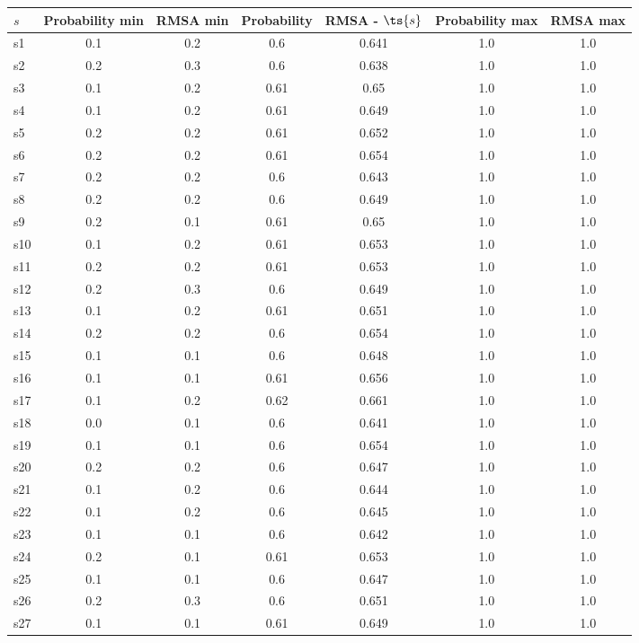 \documentclass{article}
\begin{document}
\noindent\begin{tabular}{|l|c|c|c|c|c|c|}
\hline
$s$& Probability min & RMSA min & Probability & RMSA - $\ts{s}$ & Probability max & RMSA max\\
\hline
s1 &0.1 & 0.2 & 0.6 & 0.641 & 1.0 & 1.0\\
\hline
s2 &0.2 & 0.3 & 0.6 & 0.638 & 1.0 & 1.0\\
\hline
s3 &0.1 & 0.2 & 0.61 & 0.65 & 1.0 & 1.0\\
\hline
s4 &0.1 & 0.2 & 0.61 & 0.649 & 1.0 & 1.0\\
\hline
s5 &0.2 & 0.2 & 0.61 & 0.652 & 1.0 & 1.0\\
\hline
s6 &0.2 & 0.2 & 0.61 & 0.654 & 1.0 & 1.0\\
\hline
s7 &0.2 & 0.2 & 0.6 & 0.643 & 1.0 & 1.0\\
\hline
s8 &0.2 & 0.2 & 0.6 & 0.649 & 1.0 & 1.0\\
\hline
s9 &0.2 & 0.1 & 0.61 & 0.65 & 1.0 & 1.0\\
\hline
s10 &0.1 & 0.2 & 0.61 & 0.653 & 1.0 & 1.0\\
\hline
s11 &0.2 & 0.2 & 0.61 & 0.653 & 1.0 & 1.0\\
\hline
s12 &0.2 & 0.3 & 0.6 & 0.649 & 1.0 & 1.0\\
\hline
s13 &0.1 & 0.2 & 0.61 & 0.651 & 1.0 & 1.0\\
\hline
s14 &0.2 & 0.2 & 0.6 & 0.654 & 1.0 & 1.0\\
\hline
s15 &0.1 & 0.1 & 0.6 & 0.648 & 1.0 & 1.0\\
\hline
s16 &0.1 & 0.1 & 0.61 & 0.656 & 1.0 & 1.0\\
\hline
s17 &0.1 & 0.2 & 0.62 & 0.661 & 1.0 & 1.0\\
\hline
s18 &0.0 & 0.1 & 0.6 & 0.641 & 1.0 & 1.0\\
\hline
s19 &0.1 & 0.1 & 0.6 & 0.654 & 1.0 & 1.0\\
\hline
s20 &0.2 & 0.2 & 0.6 & 0.647 & 1.0 & 1.0\\
\hline
s21 &0.1 & 0.2 & 0.6 & 0.644 & 1.0 & 1.0\\
\hline
s22 &0.1 & 0.2 & 0.6 & 0.645 & 1.0 & 1.0\\
\hline
s23 &0.1 & 0.1 & 0.6 & 0.642 & 1.0 & 1.0\\
\hline
s24 &0.2 & 0.1 & 0.61 & 0.653 & 1.0 & 1.0\\
\hline
s25 &0.1 & 0.1 & 0.6 & 0.647 & 1.0 & 1.0\\
\hline
s26 &0.2 & 0.3 & 0.6 & 0.651 & 1.0 & 1.0\\
\hline
s27 &0.1 & 0.1 & 0.61 & 0.649 & 1.0 & 1.0\\

\end{tabular}
\end{document}
